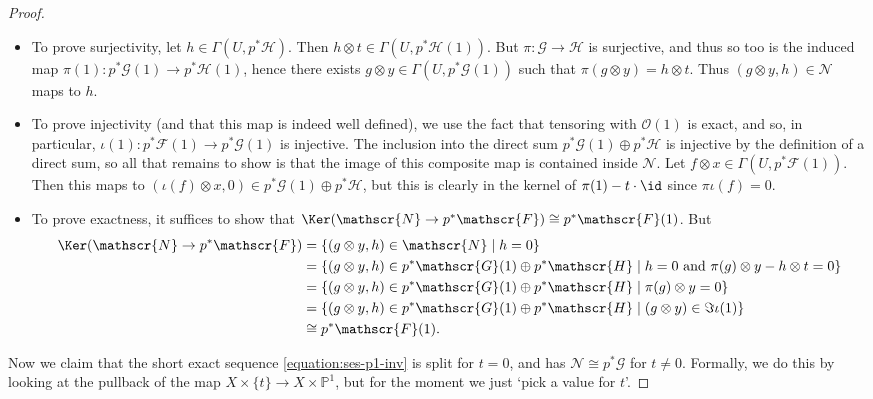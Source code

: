 \begin{proof}
        \begin{itemize}
            \item To prove surjectivity, let $h\in\Gamma(U,p^*\mathscr{H})$.
                Then $h\otimes t\in\Gamma(U,p^*\mathscr{H}(1))$.
                But $\pi\colon\mathscr{G}\to\mathscr{H}$ is surjective, and thus so too is the induced map $\pi(1)\colon p^*\mathscr{G}(1)\to p^*\mathscr{H}(1)$, hence there exists $g\otimes y\in\Gamma(U,p^*\mathscr{G}(1))$ such that $\pi(g\otimes y)=h\otimes t$.
                Thus $(g\otimes y, h)\in\mathscr{N}$ maps to $h$.
            \item To prove injectivity (and that this map is indeed well defined), we use the fact that tensoring with $\mathscr{O}(1)$ is exact, and so, in particular, $\iota(1)\colon p^*\mathscr{F}(1)\to p^*\mathscr{G}(1)$ is injective.
                The inclusion into the direct sum $p^*\mathscr{G}(1)\oplus p^*\mathscr{H}$ is injective by the definition of a direct sum, so all that remains to show is that the image of this composite map is contained inside $\mathscr{N}$.
                Let $f\otimes x\in\Gamma(U,p^*\mathscr{F}(1))$.
                Then this maps to $(\iota(f)\otimes x,0)\in p^*\mathscr{G}(1)\oplus p^*\mathscr{H}$, but this is clearly in the kernel of $\pi(1)-t\cdot\id$ since $\pi\iota(f)=0$.
            \item To prove exactness, it suffices to show that $\Ker(\mathscr{N}\to p^*\mathscr{F})\cong p^*\mathscr{F}(1)$.
                But
                \begin{align*}
                    \Ker(\mathscr{N}\to p^*\mathscr{F}) &= \{(g\otimes y, h)\in\mathscr{N} \mid h=0\}\\
                    &= \{(g\otimes y, h)\in p^*\mathscr{G}(1)\oplus p^*\mathscr{H} \mid h=0\text{ and }\pi(g)\otimes y-h\otimes t=0\}\\
                    &= \{(g\otimes y, h)\in p^*\mathscr{G}(1)\oplus p^*\mathscr{H} \mid \pi(g)\otimes y=0\}\\
                    &= \{(g\otimes y, h)\in p^*\mathscr{G}(1)\oplus p^*\mathscr{H} \mid (g\otimes y)\in\Im\iota(1)\}\\
                    &\cong p^*\mathscr{F}(1).
                \end{align*}
        \end{itemize}
        
        Now we claim that the short exact sequence \eqref{equation:ses-p1-inv} is split for $t=0$, and has $\mathscr{N}\cong p^*\mathscr{G}$ for $t\neq0$.
        Formally, we do this by looking at the pullback of the map $X\times\{t\}\to X\times\mathbb{P}^1$, but for the moment we just `pick a value for $t$'.


\end{proof}
